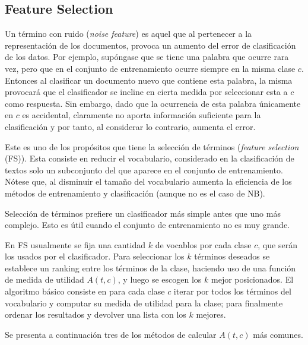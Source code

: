 \documentclass{llncs}
\begin{document}
	\subsection{Feature Selection}
		Un t\'ermino con ruido (\emph{noise feature}) es aquel que al pertenecer a la representaci\'on de los documentos, provoca un aumento del error de clasificaci\'on de los datos. Por ejemplo, sup\'ongase que se tiene una palabra que ocurre rara vez, pero que en el conjunto de entrenamiento ocurre siempre en la misma clase $c$. Entonces al clasificar un documento nuevo que contiene esta palabra, la misma provocar\'a que el clasificador se incline en cierta medida por seleccionar esta a $c$ como respuesta. Sin embargo, dado que la ocurrencia de esta palabra \'unicamente en $c$ es accidental, claramente no aporta informaci\'on suficiente para la clasificaci\'on y por tanto, al considerar lo contrario, aumenta el error.
		
		Este es uno de los prop\'ositos que tiene la selecci\'on de t\'erminos (\emph{feature selection} (FS)). Esta consiste en reducir el vocabulario, considerado en la clasificaci\'on de textos solo un subconjunto del que aparece en el conjunto de entrenamiento. N\'otese que, al disminuir el tama\~no del vocabulario aumenta la eficiencia de los m\'etodos de entrenamiento y clasificaci\'on (aunque no es el caso de NB).
		
		Selecci\'on de t\'erminos prefiere un clasificador m\'as simple antes que uno m\'as complejo. Esto es \'util cuando el conjunto de entrenamiento no es muy grande.
		

		 En FS usualmente se fija una cantidad $k$ de vocablos por cada clase $c$, que ser\'an los usados por el clasificador. Para seleccionar los $k$ t\'erminos deseados se establece un ranking entre los t\'erminos de la clase, haciendo uso de una funci\'on de medida de utilidad $A(t,c)$, y luego se escogen los $k$ mejor posicionados. El algoritmo b\'asico consiste en para cada clase $c$ iterar por todos los t\'erminos del vocabulario y computar su medida de utilidad para la clase; para finalmente ordenar los resultados y devolver una lista con los $k$ mejores.
		 
		 Se presenta a continuaci\'on tres de los m\'etodos de calcular $A(t,c)$ m\'as comunes.
		
\end{document}
